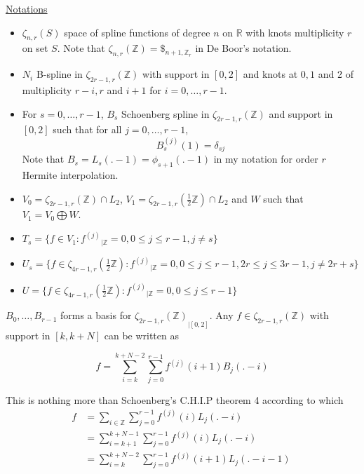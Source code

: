 \documentclass[a4paper, 11pt]{article}
\begin{document}
\underline{Notations}
\begin{itemize}
  \itemsep0em
  \item $\zeta_{n,r}(S)$ space of spline functions of degree $n$ on $\mathbb{R}$ with knots multiplicity $r$ on set $S$.  
    Note that $\zeta_{n, r}(\mathbb{Z}) = \$_{n+1, \mathbb{Z}_r}$ in De Boor's notation.
  \item $N_i$ B-spline in $\zeta_{2r-1, r}(\mathbb{Z})$ with support in $[0, 2]$ and knots at $0, 1$ and 2 of 
    multiplicity $r-i, r$ and $i+1$ for $i=0, \ldots, r-1$.
  \item For $s=0, \ldots, r-1$, $B_s$ Schoenberg spline in $\zeta_{2r-1, r}(\mathbb{Z})$ and support in $[0,2]$ such 
    that for all $j=0, \ldots, r-1$,
    \begin{equation*}
      B_s^{(j)}(1) = \delta_{sj}
    \end{equation*}
    Note that $B_s = L_s(.-1) = \phi_{s+1}(.-1)$ in my notation for order $r$ Hermite interpolation.
  \item $V_0 = \zeta_{2r-1, r}(\mathbb{Z}) \cap L_2$, $V_1 = \zeta_{2r-1, r}(\frac{1}{2}\mathbb{Z}) \cap L_2$ and $W$ 
    such that $V_1 = V_0 \bigoplus W$.
  \item $T_s = \{ f \in V_1 : {f^{(j)}}_{|\mathbb{Z}}=0, 0 \leq j \leq r-1, j\neq s \}$
  \item $U_s = \{ f \in \zeta_{4r-1,r}(\frac{1}{2}\mathbb{Z}) : {f^{(j)}}_{|\mathbb{Z}}=0, 0 \leq j \leq r-1, 2r\leq j 
    \leq 3r-1,  j\neq 2r+s \}$
  \item $U = \{ f \in \zeta_{4r-1,r}(\frac{1}{2}\mathbb{Z}) : {f^{(j)}}_{|\mathbb{Z}}=0, 0 \leq j \leq r-1\}$
\end{itemize}

$B_0, \ldots, B_{r-1}$ forms a basis for ${\zeta_{2r-1, r}(\mathbb{Z})}_{|[0,2]}$. Any $f \in {\zeta_{2r-1, 
r}(\mathbb{Z})}$ with support in $[k, k+N]$ can be written as

\begin{equation*}
  f = \sum_{i=k}^{k+N-2} \sum_{j=0}^{r-1} f^{(j)}(i+1) B_j(.-i)
\end{equation*}

This is nothing more than Schoenberg's C.H.I.P theorem 4 according to which
\begin{align*}
  f &= \sum_{i \in \mathbb{Z}} \sum_{j=0}^{r-1} f^{(j)}(i) L_j(.-i) \\
  &= \sum_{i=k+1}^{k+N-1} \sum_{j=0}^{r-1} f^{(j)}(i) L_j(.-i) \\
  &= \sum_{i=k}^{k+N-2} \sum_{j=0}^{r-1} f^{(j)}(i+1) L_j(.-i-1) \
\end{align*}
\end{document}
